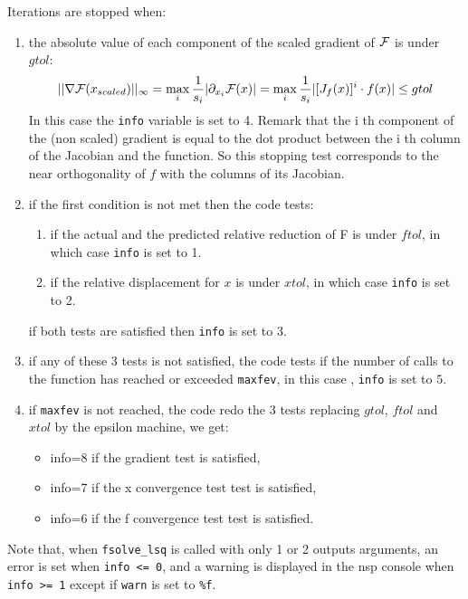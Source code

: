 \begin{mandescription}
Iterations are stopped when:
\begin{enumerate}
\item the absolute value of each component of the scaled gradient of ${\cal F}$ is under $gtol$: 
$$
||\nabla{\cal F}(x_{scaled})||_{\infty} = \max_i \frac{1}{s_i} | \partial_{x_i} {\cal F}(x) | =
\max_i \frac{1}{s_i} | [J_f(x)]^i \cdot f(x) | \le gtol
$$
In this case the \verb+info+ variable is set to 4. Remark that the i th component of the (non scaled) 
gradient is equal to the dot product between the i th column of the Jacobian and the function.
So this stopping test corresponds to the near orthogonality of $f$ with the columns of its
Jacobian.
\item if the first condition is not met then the code tests:
      \begin{enumerate}
      \item if the actual and the predicted relative reduction of {\cal F} is under $ftol$, in which case \verb+info+ is set to 1.
      \item if the relative displacement for $x$ is under $xtol$, in which case \verb+info+ is set to 2. 
      \end{enumerate}
      if both tests are satisfied then \verb+info+ is set to 3.
\item if any of these 3 tests is not satisfied, the code tests if the number of calls to the function has reached or 
      exceeded \verb+maxfev+, in this case , \verb+info+ is set to $5$.
\item if \verb+maxfev+ is not reached, the code redo the 3 tests replacing $gtol$, $ftol$ and $xtol$ by the epsilon
      machine, we get:
      \begin{itemize}
      \item info=8 if the gradient test is satisfied,  
      \item info=7 if the x convergence test test is satisfied,  
      \item info=6 if the f convergence test test is satisfied.  
      \end{itemize}
\end{enumerate}
Note that, when \verb+fsolve_lsq+ is called with only 1 or 2 outputs arguments, an error is set 
when \verb+info <= 0+, and a warning is displayed in the nsp console when \verb+info >= 1+ except 
if \verb+warn+ is set to \verb+%f+. 


\end{mandescription}
